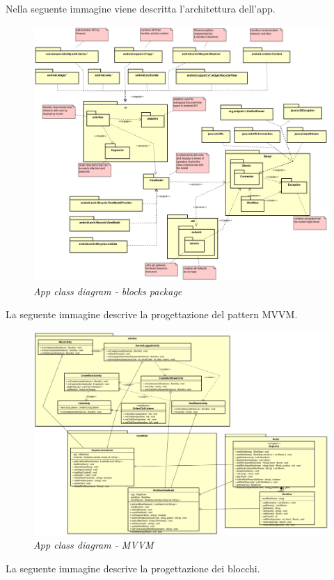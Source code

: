Nella seguente immagine viene descritta l'architettura dell'app.
\begin{figure} [H]
	\centering
	\includegraphics[scale=0.3]{./images/Package.png}
	\caption{\textit{App class diagram - blocks package}}\label{Package}
\end{figure}
\newpage
La seguente immagine descrive la progettazione del pattern MVVM.
\begin{figure} [H]
	\centering
	\includegraphics[scale=0.27]{./images/MVVM.png}
	\caption{\textit{App class diagram - MVVM}}\label{MVVM}
\end{figure}
\newpage
La seguente immagine descrive la progettazione dei blocchi.
